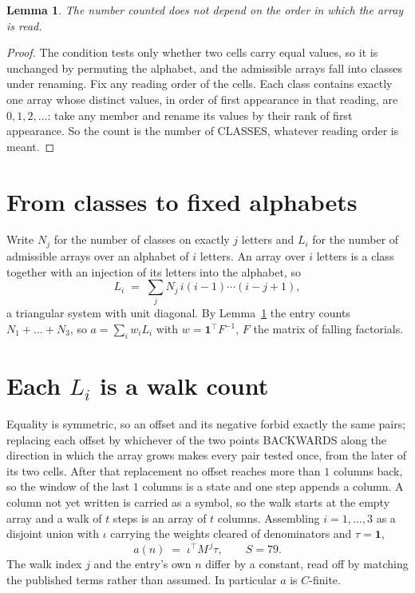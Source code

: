 \documentclass[11pt,a4paper]{article}
\theoremstyle{plain}
\newtheorem{lemma}[theorem]{Lemma}
\theoremstyle{definition}
\begin{document}
\begin{lemma}\label{lem:order}
The number counted does not depend on the order in which the array is read.
\end{lemma}

\begin{proof}
The condition tests only whether two cells carry equal values, so it is unchanged by permuting
the alphabet, and the admissible arrays fall into classes under renaming. Fix any reading order
of the cells. Each class contains exactly one array whose distinct values, in order of first
appearance in that reading, are $0,1,2,\dots$: take any member and rename its values by their
rank of first appearance. So the count is the number of CLASSES, whatever reading order is
meant.
\end{proof}

\section{From classes to fixed alphabets}

Write $N_j$ for the number of classes on exactly $j$ letters and $L_i$ for the number of
admissible arrays over an alphabet of $i$ letters. An array over $i$ letters is a class together
with an injection of its letters into the alphabet, so
\[
L_i\;=\;\sum_j N_j\,i(i-1)\cdots(i-j+1),
\]
a triangular system with unit diagonal. By Lemma~\ref{lem:order} the entry counts
$N_1+\dots+N_{3}$, so $a=\sum_i w_iL_i$ with $w=\mathbf{1}^{\!\top}F^{-1}$, $F$ the
matrix of falling factorials.

\section{Each $L_i$ is a walk count}

Equality is symmetric, so an offset and its negative forbid exactly the same pairs; replacing
each offset by whichever of the two points BACKWARDS along the direction in which the array
grows makes every pair tested once, from the later of its two cells. After that replacement no
offset reaches more than $1$ columns back, so the window of the last $1$
columns is a state and one step appends a column. A column not yet written is
carried as a symbol, so the walk starts at the empty array and a walk of $t$ steps is an array
of $t$ columns. Assembling $i=1,\dots,3$ as a disjoint union with $\iota$ carrying the
weights cleared of denominators and $\tau=\mathbf{1}$,
\[
a(n)\;=\;\iota^{\!\top}M^{\,j}\tau ,\qquad S=79.
\]
The walk index $j$ and the entry's own $n$ differ by a constant, read off by matching the
published terms rather than assumed. In particular $a$ is $C$-finite.
\end{document}
